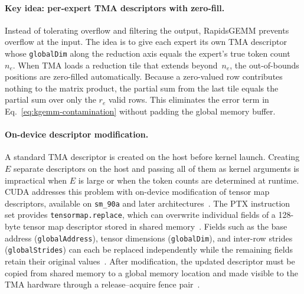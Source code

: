 \documentclass[11pt,a4paper]{article}
\theoremstyle{definition}
\begin{document}
\paragraph{Key idea: per-expert TMA descriptors with zero-fill.}
Instead of tolerating overflow and filtering the output, RapidsGEMM
prevents overflow at the input.
The idea is to give each expert its own TMA descriptor whose
\texttt{globalDim} along the reduction axis equals the expert's true
token count~$n_e$.
When TMA loads a reduction tile that extends beyond~$n_e$, the
out-of-bounds positions are zero-filled automatically.
Because a zero-valued row contributes nothing to the matrix product,
the partial sum from the last tile equals the partial sum over only the
$r_e$ valid rows.
This eliminates the error term in Eq.~\eqref{eq:kgemm-contamination}
without padding the global memory buffer.

\paragraph{On-device descriptor modification.}
A standard TMA descriptor is created on the host before kernel launch.
Creating $E$ separate descriptors on the host and passing all of them
as kernel arguments is impractical when $E$ is large or when the token
counts are determined at runtime.
CUDA addresses this problem with on-device modification of tensor map
descriptors, available on \texttt{sm\_90a} and later
architectures~\cite{nvidia_cuda_programming_guide,nvidia_ptx_isa}.
The PTX instruction set provides \texttt{tensormap.replace}, which can
overwrite individual fields of a 128-byte tensor map descriptor stored
in shared memory~\cite{nvidia_ptx_isa}.
Fields such as the base address (\texttt{globalAddress}), tensor
dimensions (\texttt{globalDim}), and inter-row strides
(\texttt{globalStrides}) can each be replaced independently while the
remaining fields retain their original
values~\cite{nvidia_cuda_programming_guide}.
After modification, the updated descriptor must be copied from shared
memory to a global memory location and made visible to the TMA hardware
through a release--acquire fence
pair~\cite{nvidia_cuda_programming_guide}.
\end{document}
